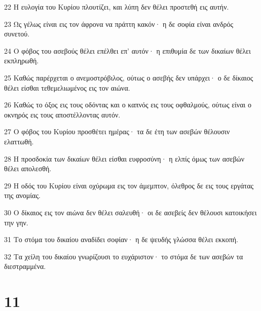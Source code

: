 \par 22 Η ευλογία του Κυρίου πλουτίζει, και λύπη δεν θέλει προστεθή εις αυτήν.
\par 23 Ως γέλως είναι εις τον άφρονα να πράττη κακόν· η δε σοφία είναι ανδρός συνετού.
\par 24 Ο φόβος του ασεβούς θέλει επέλθει επ' αυτόν· η επιθυμία δε των δικαίων θέλει εκπληρωθή.
\par 25 Καθώς παρέρχεται ο ανεμοστρόβιλος, ούτως ο ασεβής δεν υπάρχει· ο δε δίκαιος θέλει είσθαι τεθεμελιωμένος εις τον αιώνα.
\par 26 Καθώς το όξος εις τους οδόντας και ο καπνός εις τους οφθαλμούς, ούτως είναι ο οκνηρός εις τους αποστέλλοντας αυτόν.
\par 27 Ο φόβος του Κυρίου προσθέτει ημέρας· τα δε έτη των ασεβών θέλουσιν ελαττωθή.
\par 28 Η προσδοκία των δικαίων θέλει είσθαι ευφροσύνη· η ελπίς όμως των ασεβών θέλει απολεσθή.
\par 29 Η οδός του Κυρίου είναι οχύρωμα εις τον άμεμπτον, όλεθρος δε εις τους εργάτας της ανομίας.
\par 30 Ο δίκαιος εις τον αιώνα δεν θέλει σαλευθή· οι δε ασεβείς δεν θέλουσι κατοικήσει την γην.
\par 31 Το στόμα του δικαίου αναδίδει σοφίαν· η δε ψευδής γλώσσα θέλει εκκοπή.
\par 32 Τα χείλη του δικαίου γνωρίζουσι το ευχάριστον· το στόμα δε των ασεβών τα διεστραμμένα.

\chapter{11}

